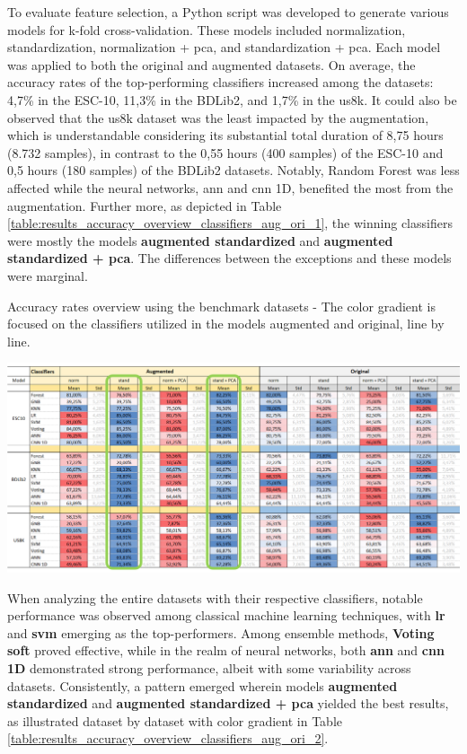 To evaluate feature selection, a Python script was developed to generate various models for k-fold cross-validation. These models included normalization, standardization, normalization + \gls{pca}, and standardization + \gls{pca}. Each model was applied to both the original and augmented datasets. On average, the accuracy rates of the top-performing classifiers increased among the datasets: 4,7\% in the  ESC-10, 11,3\% in the BDLib2, and 1,7\% in the \gls{us8k}. It could also be observed that the \gls{us8k} dataset was the least impacted by the augmentation, which is understandable considering its substantial total duration of 8,75 hours (8.732 samples), in contrast to the 0,55 hours (400 samples) of the ESC-10 and 0,5 hours (180 samples) of the BDLib2 datasets. Notably, Random Forest was less affected while the neural networks, \gls{ann} and \gls{cnn} 1D, benefited the most from the augmentation. Further more, as depicted in Table \ref{table:results_accuracy_overview_classifiers_aug_ori_1}, the winning classifiers were mostly the models \textbf{augmented standardized} and \textbf{augmented standardized + \gls{pca}}. The differences between the exceptions and these models were marginal.

\begin{table}[ht!]
    \caption[Accuracy rates overview using the benchmark datasets - Models augmented x original (Focus on the classifiers line by line)]{Accuracy rates overview using the benchmark datasets - The color gradient is focused on the classifiers utilized in the models augmented and original, line by line.}
    \label{table:results_accuracy_overview_classifiers_aug_ori_1}
     \raggedright
    \includegraphics[width=1\textwidth]{resources/images/060-results/Results_classification_overview_aug_x_ori_1.png}
\end{table}

When analyzing the entire datasets with their respective classifiers, notable performance was observed among classical machine learning techniques, with \textbf{\gls{lr}} and \textbf{\gls{svm}} emerging as the top-performers. Among ensemble methods, \textbf{Voting soft} proved effective, while in the realm of neural networks, both \textbf{\gls{ann}} and \textbf{\gls{cnn} 1D} demonstrated strong performance, albeit with some variability across datasets. Consistently, a pattern emerged wherein models \textbf{augmented standardized} and \textbf{augmented standardized + \gls{pca}} yielded the best results, as illustrated dataset by dataset with color gradient in Table \ref{table:results_accuracy_overview_classifiers_aug_ori_2}. 

